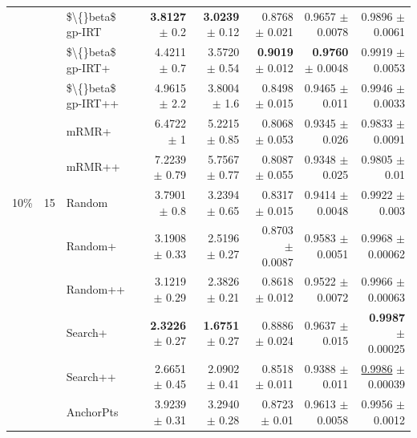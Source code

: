 \begin{longtable}{llp{}rrrrr}
 &  & \$\textbackslash\{\}beta\$ gp-IRT & \textbf{3.8127} {\scriptsize $\pm$ 0.2} & \textbf{3.0239} {\scriptsize $\pm$ 0.12} & 0.8768 {\scriptsize $\pm$ 0.021} & 0.9657 {\scriptsize $\pm$ 0.0078} & 0.9896 {\scriptsize $\pm$ 0.0061} \\
 &  & \$\textbackslash\{\}beta\$ gp-IRT+ & 4.4211 {\scriptsize $\pm$ 0.7} & 3.5720 {\scriptsize $\pm$ 0.54} & \textbf{0.9019} {\scriptsize $\pm$ 0.012} & \textbf{0.9760} {\scriptsize $\pm$ 0.0048} & 0.9919 {\scriptsize $\pm$ 0.0053} \\
 &  & \$\textbackslash\{\}beta\$ gp-IRT++ & 4.9615 {\scriptsize $\pm$ 2.2} & 3.8004 {\scriptsize $\pm$ 1.6} & 0.8498 {\scriptsize $\pm$ 0.015} & 0.9465 {\scriptsize $\pm$ 0.011} & 0.9946 {\scriptsize $\pm$ 0.0033} \\
 &  & mRMR+ & 6.4722 {\scriptsize $\pm$ 1} & 5.2215 {\scriptsize $\pm$ 0.85} & 0.8068 {\scriptsize $\pm$ 0.053} & 0.9345 {\scriptsize $\pm$ 0.026} & 0.9833 {\scriptsize $\pm$ 0.0091} \\
 &  & mRMR++ & 7.2239 {\scriptsize $\pm$ 0.79} & 5.7567 {\scriptsize $\pm$ 0.77} & 0.8087 {\scriptsize $\pm$ 0.055} & 0.9348 {\scriptsize $\pm$ 0.025} & 0.9805 {\scriptsize $\pm$ 0.01} \\
\midrule
10\% & 15 & Random & 3.7901 {\scriptsize $\pm$ 0.8} & 3.2394 {\scriptsize $\pm$ 0.65} & 0.8317 {\scriptsize $\pm$ 0.015} & 0.9414 {\scriptsize $\pm$ 0.0048} & 0.9922 {\scriptsize $\pm$ 0.003} \\
 &  & Random+ & 3.1908 {\scriptsize $\pm$ 0.33} & 2.5196 {\scriptsize $\pm$ 0.27} & 0.8703 {\scriptsize $\pm$ 0.0087} & 0.9583 {\scriptsize $\pm$ 0.0051} & 0.9968 {\scriptsize $\pm$ 0.00062} \\
 &  & Random++ & 3.1219 {\scriptsize $\pm$ 0.29} & 2.3826 {\scriptsize $\pm$ 0.21} & 0.8618 {\scriptsize $\pm$ 0.012} & 0.9522 {\scriptsize $\pm$ 0.0072} & 0.9966 {\scriptsize $\pm$ 0.00063} \\
 &  & Search+ & \textbf{2.3226} {\scriptsize $\pm$ 0.27} & \textbf{1.6751} {\scriptsize $\pm$ 0.27} & 0.8886 {\scriptsize $\pm$ 0.024} & 0.9637 {\scriptsize $\pm$ 0.015} & \textbf{0.9987} {\scriptsize $\pm$ 0.00025} \\
 &  & Search++ & 2.6651 {\scriptsize $\pm$ 0.45} & 2.0902 {\scriptsize $\pm$ 0.41} & 0.8518 {\scriptsize $\pm$ 0.011} & 0.9388 {\scriptsize $\pm$ 0.011} & \underline{0.9986} {\scriptsize $\pm$ 0.00039} \\
 &  & AnchorPts & 3.9239 {\scriptsize $\pm$ 0.31} & 3.2940 {\scriptsize $\pm$ 0.28} & 0.8723 {\scriptsize $\pm$ 0.01} & 0.9613 {\scriptsize $\pm$ 0.0058} & 0.9956 {\scriptsize $\pm$ 0.0012} \\

\end{longtable}
